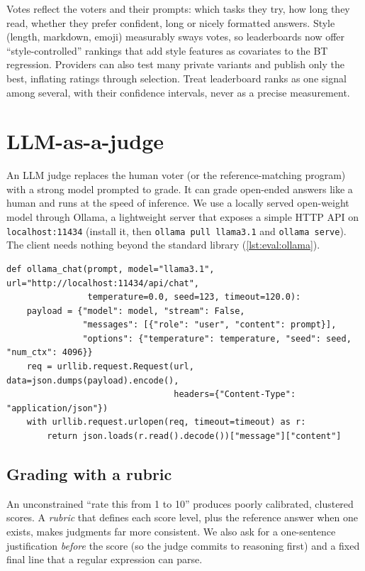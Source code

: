 \begin{deepdive}
Votes reflect the voters and their prompts: which tasks they try, how long they read, whether they
prefer confident, long or nicely formatted answers. Style (length, markdown, emoji) measurably
sways votes, so leaderboards now offer ``style-controlled'' rankings that add style features as
covariates to the BT regression. Providers can also test many private variants and publish only
the best, inflating ratings through selection. Treat leaderboard ranks as one signal among
several, with their confidence intervals, never as a precise measurement.
\end{deepdive}

\section{LLM-as-a-judge}\label{sec:eval:judge}

An LLM judge replaces the human voter (or the reference-matching program) with a strong model
prompted to grade. It can grade open-ended answers like a human and runs at the speed of
inference. We use a locally served open-weight model through Ollama, a lightweight server that
exposes a simple HTTP API on \texttt{localhost:11434} (install it, then
\texttt{ollama pull llama3.1} and \texttt{ollama serve}). The client needs nothing beyond the
standard library (\cref{lst:eval:ollama}).

\begin{lstlisting}[caption={A dependency-free Ollama chat client.},label={lst:eval:ollama}]
def ollama_chat(prompt, model="llama3.1", url="http://localhost:11434/api/chat",
                temperature=0.0, seed=123, timeout=120.0):
    payload = {"model": model, "stream": False,
               "messages": [{"role": "user", "content": prompt}],
               "options": {"temperature": temperature, "seed": seed, "num_ctx": 4096}}
    req = urllib.request.Request(url, data=json.dumps(payload).encode(),
                                 headers={"Content-Type": "application/json"})
    with urllib.request.urlopen(req, timeout=timeout) as r:
        return json.loads(r.read().decode())["message"]["content"]
\end{lstlisting}

\subsection{Grading with a rubric}
An unconstrained ``rate this from 1 to 10'' produces poorly calibrated, clustered scores. A
\emph{rubric} that defines each score level, plus the reference answer when one exists, makes
judgments far more consistent. We also ask for a one-sentence justification \emph{before} the
score (so the judge commits to reasoning first) and a fixed final line that a regular expression
can parse.

